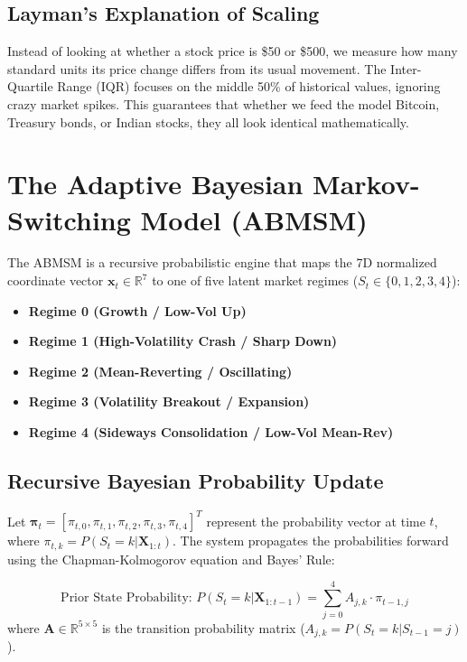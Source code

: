 \documentclass[11pt,a4paper]{article}
\begin{document}
\subsection{Layman's Explanation of Scaling}
Instead of looking at whether a stock price is \$50 or \$500, we measure how many standard units its price change differs from its usual movement. The Inter-Quartile Range (IQR) focuses on the middle 50\% of historical values, ignoring crazy market spikes. This guarantees that whether we feed the model Bitcoin, Treasury bonds, or Indian stocks, they all look identical mathematically.

\newpage
\section{The Adaptive Bayesian Markov-Switching Model (ABMSM)}

The ABMSM is a recursive probabilistic engine that maps the 7D normalized coordinate vector $\mathbf{x}_t \in \mathbb{R}^7$ to one of five latent market regimes ($S_t \in \{0, 1, 2, 3, 4\}$):
\begin{itemize}
    \item \textbf{Regime 0 (Growth / Low-Vol Up)}
    \item \textbf{Regime 1 (High-Volatility Crash / Sharp Down)}
    \item \textbf{Regime 2 (Mean-Reverting / Oscillating)}
    \item \textbf{Regime 3 (Volatility Breakout / Expansion)}
    \item \textbf{Regime 4 (Sideways Consolidation / Low-Vol Mean-Rev)}
\end{itemize}

\subsection{Recursive Bayesian Probability Update}

Let $\boldsymbol{\pi}_t = [\pi_{t, 0}, \pi_{t, 1}, \pi_{t, 2}, \pi_{t, 3}, \pi_{t, 4}]^T$ represent the probability vector at time $t$, where $\pi_{t, k} = P(S_t = k | \mathbf{X}_{1:t})$. The system propagates the probabilities forward using the Chapman-Kolmogorov equation and Bayes' Rule:

\begin{equation}
    \text{Prior State Probability: } P(S_t = k | \mathbf{X}_{1:t-1}) = \sum_{j=0}^4 A_{j, k} \cdot \pi_{t-1, j}
\end{equation}
where $\mathbf{A} \in \mathbb{R}^{5 \times 5}$ is the transition probability matrix ($A_{j, k} = P(S_t = k | S_{t-1} = j)$).
\end{document}
